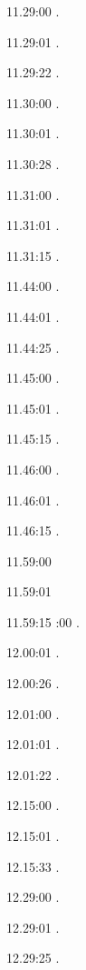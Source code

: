 \label{key}\documentclass[italian]{article}
\begin{document}
11.29:00   . 

11.29:01   . 

11.29:22   . 

11.30:00   .

11.30:01   .

11.30:28   .

11.31:00   .

11.31:01   .

11.31:15   .

11.44:00   .

11.44:01   .

11.44:25   .

11.45:00   .

11.45:01   .

11.45:15   .

11.46:00   .

11.46:01   .

11.46:15   .

11.59:00   

11.59:01   

11.59:15   
:00   .

12.00:01  .

12.00:26   .

12.01:00    . 

12.01:01    . 

12.01:22    . 

12.15:00   . 

12.15:01    . 

12.15:33    . 

12.29:00    . 

12.29:01    .

12.29:25    .
\end{document}
